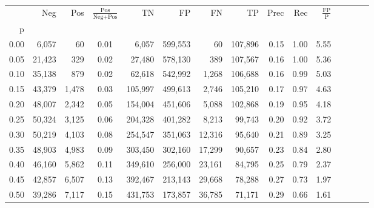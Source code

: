 \begin{tabular}{rrrcrrrrrrrrrrr}
\toprule
{} &     Neg &    Pos & $\frac{\text{Pos}}{\text{Neg}+\text{Pos}}$ &       TN &       FP &       FN &       TP &  Prec &   Rec & $\frac{\text{FP}}{\text{P}}$ \\
p    &         &        &                                            &          &          &          &          &       &       &                              \\
\midrule
0.00 &   6,057 &     60 &                                       0.01 &    6,057 &  599,553 &       60 &  107,896 &  0.15 &  1.00 &                         5.55 \\
0.05 &  21,423 &    329 &                                       0.02 &   27,480 &  578,130 &      389 &  107,567 &  0.16 &  1.00 &                         5.36 \\
0.10 &  35,138 &    879 &                                       0.02 &   62,618 &  542,992 &    1,268 &  106,688 &  0.16 &  0.99 &                         5.03 \\
0.15 &  43,379 &  1,478 &                                       0.03 &  105,997 &  499,613 &    2,746 &  105,210 &  0.17 &  0.97 &                         4.63 \\
0.20 &  48,007 &  2,342 &                                       0.05 &  154,004 &  451,606 &    5,088 &  102,868 &  0.19 &  0.95 &                         4.18 \\
0.25 &  50,324 &  3,125 &                                       0.06 &  204,328 &  401,282 &    8,213 &   99,743 &  0.20 &  0.92 &                         3.72 \\
0.30 &  50,219 &  4,103 &                                       0.08 &  254,547 &  351,063 &   12,316 &   95,640 &  0.21 &  0.89 &                         3.25 \\
0.35 &  48,903 &  4,983 &                                       0.09 &  303,450 &  302,160 &   17,299 &   90,657 &  0.23 &  0.84 &                         2.80 \\
0.40 &  46,160 &  5,862 &                                       0.11 &  349,610 &  256,000 &   23,161 &   84,795 &  0.25 &  0.79 &                         2.37 \\
0.45 &  42,857 &  6,507 &                                       0.13 &  392,467 &  213,143 &   29,668 &   78,288 &  0.27 &  0.73 &                         1.97 \\
0.50 &  39,286 &  7,117 &                                       0.15 &  431,753 &  173,857 &   36,785 &   71,171 &  0.29 &  0.66 &                         1.61 \\

\end{tabular}
